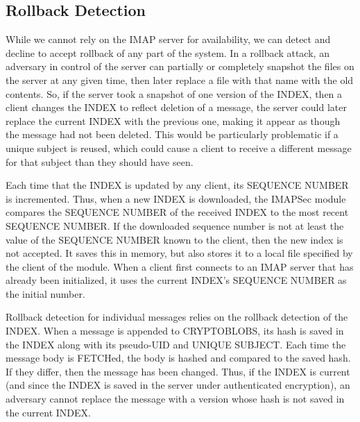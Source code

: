 \documentclass[pageno]{jpaper}
\newcommand{\project}{IMAPSec }
\begin{document}
\label{rollback}
\subsection{Rollback Detection}
While we cannot rely on the IMAP server for availability, we can detect and decline to accept rollback of any part of the system. In a rollback attack, an adversary in control of the server can partially or completely snapshot the files on the server at any given time, then later replace a file with that name with the old contents. So, if the server took a snapshot of one version of the INDEX, then a client changes the INDEX to reflect deletion of a message, the server could later replace the current INDEX with the previous one, making it appear as though the message had not been deleted. This would be particularly problematic if a unique subject is reused, which could cause a client to receive a different message for that subject than they should have seen.

 Each time that the INDEX is updated by any client, its SEQUENCE NUMBER is incremented. Thus, when a new INDEX is downloaded, the \project module compares the SEQUENCE NUMBER of the received INDEX to the most recent SEQUENCE NUMBER. If the downloaded sequence number is not at least the value of the SEQUENCE NUMBER known to the client, then the new index is not accepted. It saves this in memory, but also stores it to a local file specified by the client of the module. When a client first connects to an IMAP server that has already been initialized, it uses the current INDEX's SEQUENCE NUMBER as the initial number.

Rollback detection for individual messages relies on the rollback detection of the INDEX. When a message is appended to CRYPTOBLOBS, its hash is saved in the INDEX along with its pseudo-UID and UNIQUE SUBJECT. Each time the message body is FETCHed, the body is hashed and compared to the saved hash. If they differ, then the message has been changed. Thus, if the INDEX is current (and since the INDEX is saved in the server under authenticated encryption), an adversary cannot replace the message with a version whose hash is not saved in the current INDEX.
\end{document}
